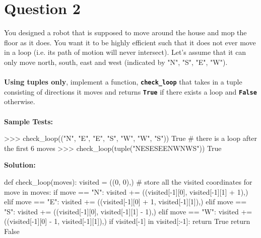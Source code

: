 \section{Question 2}
You designed a robot that is supposed to move around the house and mop the floor as it
does. You want it to be highly efficient such that it does not ever move in a loop (i.e. its path of
motion will never intersect). Let’s assume that it can only move north, south, east and west
(indicated by "N", "S", "E", "W"). \\ \\
\textbf{Using tuples only}, implement a function, \texttt{\bfseries check\_loop} that
takes in a tuple consisting of directions it moves and returns \texttt{\bfseries True} if there exists a loop and
\texttt{\bfseries False} otherwise. \\ \\
\textbf{Sample Tests:}
\begin{python}
>>> check_loop(("N", "E", "E", "S", "W", "W", "S"))
True # there is a loop after the first 6 moves
>>> check_loop(tuple("NESESEENWNWS"))
True
\end{python}
\textbf{Solution:}
\begin{python}
def check_loop(moves):
    visited = ((0, 0),) # store all the visited coordinates
    for move in moves:
        if move == "N":
            visited += ((visited[-1][0], visited[-1][1] + 1),)
        elif move == "E":
            visited += ((visited[-1][0] + 1, visited[-1][1]),)
        elif move == "S":
            visited += ((visited[-1][0], visited[-1][1] - 1),)
        elif move == "W":
            visited += ((visited[-1][0] - 1, visited[-1][1]),)
        if visited[-1] in visited[:-1]:
            return True
    return False
\end{python}

